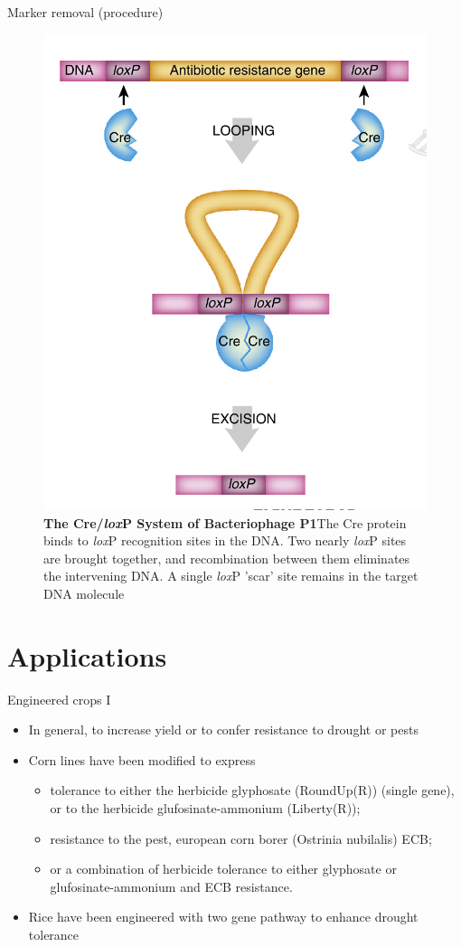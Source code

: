 \documentclass[
  ignorenonframetext,
  aspectratio=169]{beamer}
\providecommand{\tightlist}{%
  \setlength{\itemsep}{0pt}\setlength{\parskip}{0pt}}
\begin{document}
\begin{frame}{Marker removal (procedure)}
\protect\hypertarget{marker-removal-procedure}{}
\begin{figure}
\includegraphics[width=0.35\linewidth]{../images/marker_removal} \caption{\textbf{The Cre/\textit{lox}P System of Bacteriophage P1}\newline The Cre protein binds to \textit{lox}P recognition sites in the DNA. Two nearly \textit{lox}P sites are brought together, and recombination between them eliminates the intervening DNA. A single \textit{lox}P 'scar' site remains in the target DNA molecule}\label{fig:marker-removal}
\end{figure}
\end{frame}

\hypertarget{applications}{%
\section{Applications}\label{applications}}

\begin{frame}{Engineered crops I}
\protect\hypertarget{engineered-crops-i}{}
\begin{itemize}
\tightlist
\item
  In general, to increase yield or to confer resistance to drought or
  pests
\item
  Corn lines have been modified to express

  \begin{itemize}
  \tightlist
  \item
    tolerance to either the herbicide glyphosate (RoundUp(R)) (single
    gene), or to the herbicide glufosinate-ammonium (Liberty(R));
  \item
    resistance to the pest, european corn borer (Ostrinia nubilalis)
    ECB;
  \item
    or a combination of herbicide tolerance to either glyphosate or
    glufosinate-ammonium and ECB resistance.
  \end{itemize}
\item
  Rice have been engineered with two gene pathway to enhance drought
  tolerance
\end{itemize}
\end{frame}
\end{document}
